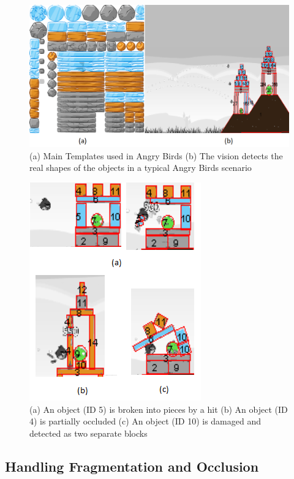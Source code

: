 \documentclass[letterpaper]{article}
\begin{document}
\begin{figure}[h!]
\centering\includegraphics[scale=0.28]{Templates.png}\caption{(a) Main Templates used in Angry Birds (b) The vision detects the real shapes of the objects in a typical Angry Birds scenario}
\label{Templates}
\end{figure}

\begin{figure}[h!]
\centering\includegraphics[scale=0.7]{Fragmentation.png}\caption{(a) An object (ID 5) is broken into pieces by a hit (b) An object (ID 4) is partially occluded (c) An object (ID 10) is damaged and detected as two separate blocks}
\label{Fragments}
\end{figure}



\subsection{Handling Fragmentation and Occlusion}
\end{document}
